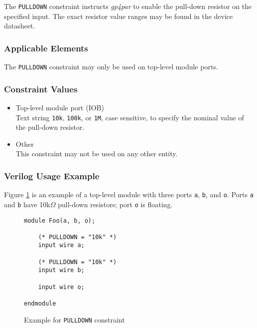 \documentclass[11pt]{article}
\newcommand{\namestyle}[1]{\textit{#1}}
\newcommand{\tokenstyle}[1]{\texttt{#1}}
\newcommand{\wirestyle}[1]{\texttt{#1}}
\newcommand{\valuestyle}[1]{\texttt{#1}}
\newcommand{\strvaluestyle}[1]{\valuestyle{\textquotedbl#1\textquotedbl}}
\newcommand{\whenstyle}[1]{{\fontseries{sb}\selectfont#1}}
\begin{document}
The \tokenstyle{PULLDOWN} constraint instructs \namestyle{gp4par} to enable the pull-down resistor on the specified input. The exact resistor
value ranges may be found in the device datasheet.

\subsubsection{Applicable Elements}
The \tokenstyle{PULLDOWN} constraint may only be used on top-level module ports.

\subsubsection{Constraint Values}
\begin{itemize}
\item \whenstyle{Top-level module port (IOB)}\\
Text string \strvaluestyle{10k}, \strvaluestyle{100k}, or \strvaluestyle{1M}, case sensitive, to specify the nominal value of the pull-down resistor.
\item \whenstyle{Other} \\
This constraint may not be used on any other entity.
\end{itemize}

\subsubsection{Verilog Usage Example}

Figure \ref{constraint-pulldown} is an example of a top-level module with three ports \wirestyle{a}, \wirestyle{b}, and
\wirestyle{o}. Ports \wirestyle{a} and \wirestyle{b} have 10k$\Omega$ pull-down resistors; port \wirestyle{o} is floating.

\begin{figure}[h]
\begin{lstlisting}
module Foo(a, b, o);

	(* PULLDOWN = "10k" *)
	input wire a;

	(* PULLDOWN = "10k" *)
	input wire b;

	input wire o;

endmodule
\end{lstlisting}
\caption{Example for \tokenstyle{PULLDOWN} constraint}
\label{constraint-pulldown}
\end{figure}

\end{document}
